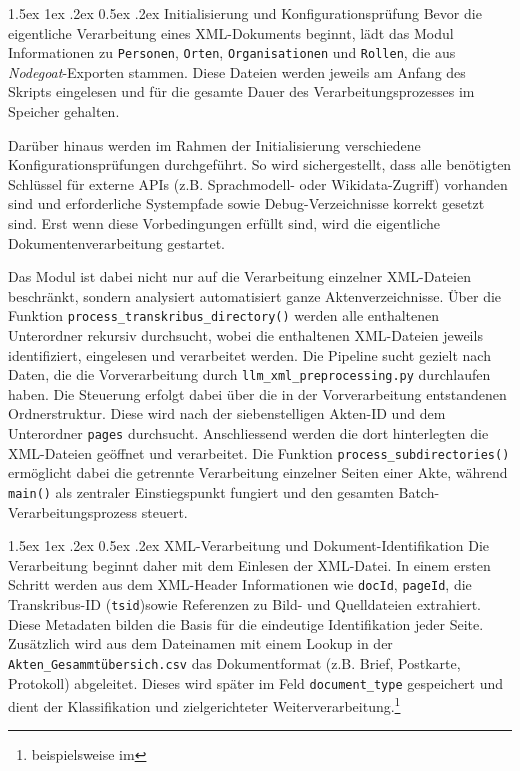 \documentclass[12pt, a4paper, ngerman, bidi=default]{article}
\makeatletter
\newcommand{\code}[1]{\colorbox{VeryLightGray}{\texttt{#1}}} %
\let\oldparagraph\paragraph%
\renewcommand{\paragraph}{
    \@ifstar%
      \xxxParagraphStar%
      \xxxParagraphNoStar%
 }
\newcommand{\xxxParagraphStar}[1]{\oldparagraph*{#1}\mbox{}}
\newcommand{\xxxParagraphNoStar}[1]{\oldparagraph{#1}\mbox{}}
\renewcommand\paragraph{\@startsection{paragraph}{4}{0em}%
  {1.5ex \@plus1ex \@minus.2ex}%
  {0.5ex \@plus.2ex}%
  {\normalfont\normalsize\bfseries\itshape}}
\makeatother
\begin{document}
\paragraph{Initialisierung und Konfigurationsprüfung}
Bevor die eigentliche Verarbeitung eines XML-Dokuments beginnt, lädt das Modul Informationen zu \code{Personen}, \code{Orten}, \code{Organisationen} und \code{Rollen}, die aus \textit{Nodegoat}-Exporten stammen. Diese Dateien werden jeweils am Anfang des Skripts eingelesen und für die gesamte Dauer des Verarbeitungsprozesses im Speicher gehalten.

Darüber hinaus werden im Rahmen der Initialisierung verschiedene Konfigurationsprüfungen durchgeführt. So wird sichergestellt, dass alle benötigten Schlüssel für externe APIs (z.B. Sprachmodell- oder Wikidata-Zugriff) vorhanden sind und erforderliche Systempfade sowie Debug-Verzeichnisse korrekt gesetzt sind. Erst wenn diese Vorbedingungen erfüllt sind, wird die eigentliche Dokumentenverarbeitung gestartet.

Das Modul ist dabei nicht nur auf die Verarbeitung einzelner XML-Dateien beschränkt, sondern analysiert automatisiert ganze Aktenverzeichnisse. Über die Funktion \code{process\_transkribus\_directory()} werden alle enthaltenen Unterordner rekursiv durchsucht, wobei die enthaltenen XML-Dateien jeweils identifiziert, eingelesen und verarbeitet werden. Die Pipeline sucht gezielt nach Daten, die die Vorverarbeitung durch \code{llm\_xml\_preprocessing.py} durchlaufen haben. Die Steuerung erfolgt dabei über die in der Vorverarbeitung entstandenen Ordnerstruktur. Diese wird nach der siebenstelligen Akten-ID und dem Unterordner \code{pages} durchsucht. Anschliessend werden die dort hinterlegten die XML-Dateien geöffnet und verarbeitet. Die Funktion \code{process\_subdirectories()} ermöglicht dabei die getrennte Verarbeitung einzelner Seiten einer Akte, während \code{main()} als zentraler Einstiegspunkt fungiert und den gesamten Batch-Verarbeitungsprozess steuert.

\paragraph{XML-Verarbeitung und Dokument-Identifikation}
Die Verarbeitung beginnt daher mit dem Einlesen der XML-Datei. In einem ersten Schritt werden aus dem XML-Header 
Informationen wie \code{docId}, \code{pageId}, die Transkribus-ID (\code{tsid})sowie Referenzen zu Bild- und Quelldateien extrahiert. Diese Metadaten 
bilden die Basis für die eindeutige Identifikation jeder Seite. Zusätzlich wird aus dem Dateinamen mit einem Lookup in der \code{Akten\_Gesammtübersich.csv} das Dokumentformat (z.B. Brief, 
Postkarte, Protokoll) abgeleitet. Dieses wird später im Feld \code{document\_type} gespeichert und dient der Klassifikation und zielgerichteter Weiterverarbeitung.\footnote{beispielsweise im }
\end{document}
